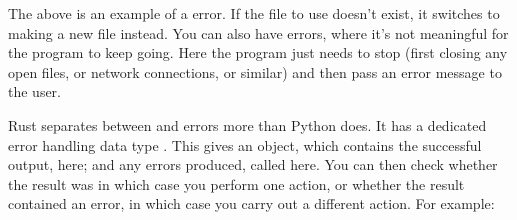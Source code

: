 \documentclass[letterpaper,10pt,british]{sphinxmanual}
\begin{document}
\begin{sphinxVerbatim}[commandchars=\\\{\}]
  
        
 
        
\end{sphinxVerbatim}

\sphinxAtStartPar
The above is an example of a  error. If the file to use doesn’t exist, it switches to making a new file instead. You can also have  errors, where it’s not meaningful for the program to keep going. Here the program just needs to stop (first closing any open files, or network connections, or similar) and then pass an error message to the user.

\sphinxAtStartPar
Rust separates between  and  errors more than Python does. It has a dedicated error handling data type . This gives an object, which contains the successful output,  here; and any errors produced, called  here. You can then check whether the result was  in which case you perform one action, or whether the result contained an error, in which case you carry out a different action. For example:
\end{document}
